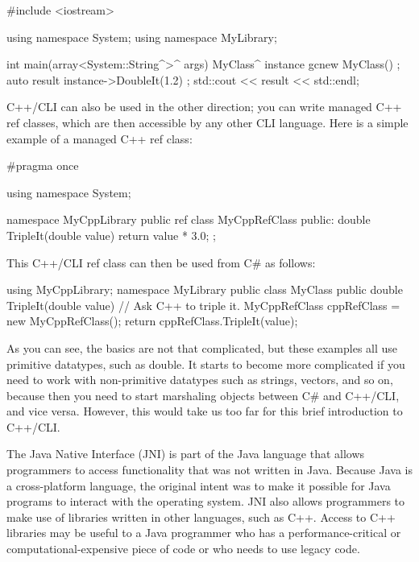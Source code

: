 \begin{cpp}
#include <iostream>

using namespace System;
using namespace MyLibrary;

int main(array<System::String^>^ args)
{
    MyClass^ instance { gcnew MyClass() };
    auto result { instance->DoubleIt(1.2) };
    std::cout << result << std::endl;
}
\end{cpp}

C++/CLI can also be used in the other direction; you can write managed C++ ref classes, which are then accessible by any other CLI language. Here is a simple example of a managed C++ ref class:

\begin{cpp}
#pragma once

using namespace System;

namespace MyCppLibrary
{
    public ref class MyCppRefClass
    {
        public:
            double TripleIt(double value) { return value * 3.0; }
    };
}
\end{cpp}

This C++/CLI ref class can then be used from C\# as follows:

\begin{cpp}
using MyCppLibrary;
namespace MyLibrary
{
    public class MyClass
    {
        public double TripleIt(double value)
        {
            // Ask C++ to triple it.
            MyCppRefClass cppRefClass = new MyCppRefClass();
            return cppRefClass.TripleIt(value);
        }
    }
}
\end{cpp}

As you can see, the basics are not that complicated, but these examples all use primitive datatypes, such as double. It starts to become more complicated if you need to work with non-primitive datatypes such as strings, vectors, and so on, because then you need to start marshaling objects between C\# and C++/CLI, and vice versa. However, this would take us too far for this brief introduction to C++/CLI.


The Java Native Interface (JNI) is part of the Java language that allows programmers to access functionality that was not written in Java. Because Java is a cross-platform language, the original intent was to make it possible for Java programs to interact with the operating system. JNI also allows programmers to make use of libraries written in other languages, such as C++. Access to C++ libraries may be useful to a Java programmer who has a performance-critical or computational-expensive piece of code or who needs to use legacy code.


